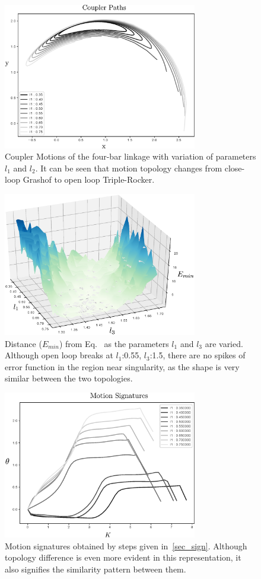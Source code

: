 \begin{figure}
\centering
\includegraphics[width=240pt]{jcise-18/figure/fig_sa_coupler_curves.eps}
  \caption{Coupler Motions of the four-bar linkage with variation of parameters $l_1$ and $l_2$. It can be seen that motion topology changes from close-loop Grashof to open loop Triple-Rocker.}
\label{saCouplerCurves}
\end{figure}

\begin{figure}
\centering
\includegraphics[width=240pt]{jcise-18/figure/fig_sa_distance_function.eps}
  \caption{Distance ($E_{min}$) from Eq.~ as the parameters $l_1$ and $l_3$ are varied. Although open loop breaks at $l_1$:0.55, $l_3$:1.5, there are no spikes of error function in the region near singularity, as the shape is very similar between the two topologies.}
\label{saErrorFunction}
\end{figure}

\begin{figure}
\centering
\includegraphics[width=240pt]{jcise-18/figure/fig_sa_motion_signatures.eps}
  \caption{Motion signatures obtained by steps given in~\ref{sec_sign}. Although topology difference is even more evident in this representation, it also signifies the similarity pattern between them.}
\label{saMotionSignatures}
\end{figure}

